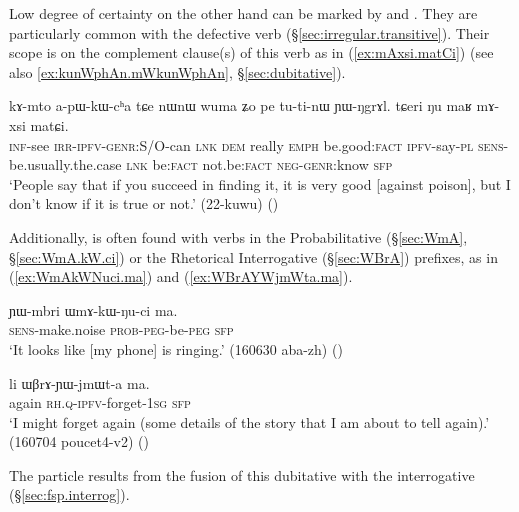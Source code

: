Low degree of certainty on the other hand can be marked by   and . They are particularly common with the defective verb  (§\ref{sec:irregular.transitive}). Their scope is on the complement clause(s) of this verb as in (\ref{ex:mAxsi.matCi}) (see also \ref{ex:kunWphAn.mWkunWphAn}, §\ref{sec:dubitative}). 

\begin{exe} 
\ex \label{ex:mAxsi.matCi}
\gll  kɤ-mto a-pɯ-kɯ-cʰa tɕe nɯnɯ wuma ʑo pe tu-ti-nɯ ɲɯ-ŋgrɤl.
tɕeri ŋu maʁ mɤ-xsi matɕi. \\
\textsc{inf}-see \textsc{irr}-\textsc{ipfv}-\textsc{genr}:S/O-can \textsc{lnk} \textsc{dem} really \textsc{emph} be.good:\textsc{fact} \textsc{ipfv}-say-\textsc{pl} \textsc{sens}-be.usually.the.case \textsc{lnk} be:\textsc{fact} not.be:\textsc{fact} \textsc{neg}-\textsc{genr}:know \textsc{sfp} \\
\glt `People say that if you succeed in finding it, it is very good [against poison], but I don't know if it is true or not.' (22-kuwu)
()
\end{exe} 
 
Additionally,  is often found with verbs in the Probabilitative (§\ref{sec:WmA}, §\ref{sec:WmA.kW.ci})  or the Rhetorical Interrogative (§\ref{sec:WBrA}) prefixes, as in (\ref{ex:WmAkWNuci.ma}) and (\ref{ex:WBrAYWjmWta.ma}).

\begin{exe} 
\ex \label{ex:WmAkWNuci.ma}
\gll ɲɯ-mbri ɯmɤ-kɯ-ŋu-ci ma. \\
\textsc{sens}-make.noise \textsc{prob}-\textsc{peg}-be-\textsc{peg} \textsc{sfp} \\
\glt `It looks like [my phone] is ringing.' (160630 aba-zh) 	()
 \end{exe} 

\begin{exe} 
\ex \label{ex:WBrAYWjmWta.ma}
\gll li ɯβrɤ-ɲɯ-jmɯt-a ma. \\
again \textsc{rh}.\textsc{q}-\textsc{ipfv}-forget-\textsc{1sg} \textsc{sfp} \\
\glt `I might forget again (some details of the story that I am about to tell again).' (160704 poucet4-v2) 	()
\end{exe} 

The particle  results from the fusion of this dubitative  with the interrogative  (§\ref{sec:fsp.interrog}).

